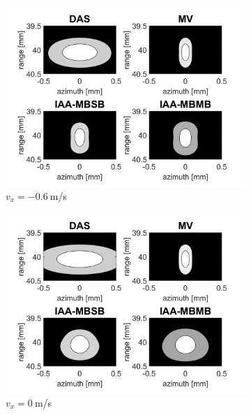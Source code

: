 \begin{figure}[ht]
    \centering
    \begin{subfigure}[t]{0.48\linewidth}
        \includegraphics[width=\linewidth]{./images/results/2.1/motion_0_-06.png}
        \caption{$v_x = -0.6~$m/s}
    \end{subfigure}
    \quad
    \begin{subfigure}[t]{0.48\linewidth}
        \includegraphics[width=\linewidth]{./images/results/2.1/motion_0_0.png}
        \caption{$v_x = 0~$m/s}
        \label{fig:DAS_idle}
    \end{subfigure}
    \quad
    \begin{subfigure}[t]{0.48\linewidth}

\end{subfigure}
\end{figure}
